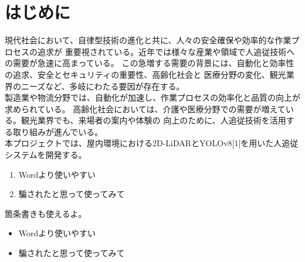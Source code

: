 \section{はじめに}

現代社会において、自律型技術の進化と共に、人々の安全確保や効率的な作業プロセスの追求が
重要視されている。近年では様々な産業や領域で人追従技術への需要が急速に高まっている。
この急増する需要の背景には、自動化と効率性の追求、安全とセキュリティの重要性、高齢化社会と
医療分野の変化、観光業界のニーズなど、多岐にわたる要因が存在する。\\ \indent
製造業や物流分野では、自動化が加速し、作業プロセスの効率化と品質の向上が求められている。
高齢化社会においては、介護や医療分野での需要が増えている。観光業界でも、来場者の案内や体験の
向上のために、人追従技術を活用する取り組みが進んでいる。\\ \indent
本プロジェクトでは、屋内環境における2D-LiDARとYOLOv8[1]を用いた人追従システムを開発する。



\begin{enumerate}
  \item Wordより使いやすい
  \item 騙されたと思って使ってみて
\end{enumerate}

箇条書きも使えるよ。

\begin{itemize}
  \item Wordより使いやすい
  \item 騙されたと思って使ってみて
\end{itemize}